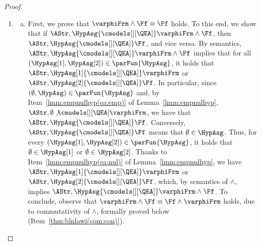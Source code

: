 \documentclass[authoryear]{elsarticle}
\newcommand{\EmpHypAsg}{\emptyset}
\newcommand{\iffExpl}[1]{\mathrel{\stackrel{\text{\tiny #1}}{\Leftrightarrow}}}
\newcommand{\EAmodels}{{\cmodels[][\QEA]}}
\begin{document}
\begin{proof}
\begin{enumerate}[1)]
\begin{enumerate}[a)]
    \item $\HypAsg \cmodels[][\alpha] \neg\neg\varphiFrm \iffExpl{sem.}
      \HypAsg \not\cmodels[][\dual{\alpha}] \neg\varphiFrm \iffExpl{sem.}
      \HypAsg \cmodels[][\alpha] \varphiFrm$.
    \end{enumerate}
  \item
    \begin{enumerate}[a)]
    \item
      First, we prove that $\varphiFrm \land \Ff \equiv \Ff$ holds.
      To this end, we show that if $\AStr, \HypAsg \EAmodels \varphiFrm \land
      \Ff$, then $\AStr, \HypAsg \EAmodels \Ff$, and vice versa.
      By semantics, $\AStr, \HypAsg \EAmodels \varphiFrm \land \Ff$ implies that
      for all $(\HypAsg[1], \HypAsg[2]) \in \parFun{\HypAsg}$, it holds that
      $\AStr, \HypAsg[1] \EAmodels \varphiFrm$ or $\AStr, \HypAsg[2] \EAmodels
      \Ff$. In particular, since $(\EmpHypAsg, \HypAsg) \in \parFun{\HypAsg}$
      and, by Item~\ref{lmm:empnulhyp(ea:emp)} of Lemma~\ref{lmm:empnulhyp},
      $\AStr, \EmpHypAsg \not\cmodels[][\QEA] \varphiFrm$, we have that $\AStr,
      \HypAsg \EAmodels \Ff$.
      Conversely, $\AStr, \HypAsg \EAmodels \Ff$ means that $\emptyset \in
      \HypAsg$.
      Thus, for every $(\HypAsg[1], \HypAsg[2]) \in \parFun{\HypAsg}$, it holds
      that $\emptyset \in \HypAsg[1]$ or $\emptyset \in \HypAsg[2]$. Thanks to
      Item~\ref{lmm:empnulhyp(ea:nul)} of Lemma~\ref{lmm:empnulhyp}, we have
      $\AStr, \HypAsg[1] \EAmodels \varphiFrm$ or $\AStr, \HypAsg[2] \EAmodels
      \Ff$, which, by semantics of $\land$, implies $\AStr, \HypAsg \EAmodels
      \varphiFrm \land \Ff$.
      To conclude, observe that $\varphiFrm \land \Ff \equiv \Ff \land
      \varphiFrm$ holds, due to commutativity of $\land$, formally proved below
      (Item~\ref{thm:blnlawi(com:con)}).


\end{enumerate}
\end{enumerate}
\end{proof}
\end{document}
